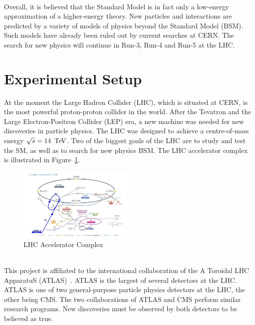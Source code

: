 \ \\Overall, it is believed that the Standard Model is in fact only a low-energy approximation of a higher-energy theory. New particles and interactions are predicted by a variety of models of physics beyond the Standard Model (BSM). Such models have already been ruled out by current searches at CERN. The search for new physics will continue in Run-3, Run-4 and Run-5 at the LHC.

\section{Experimental Setup}
\label{sec:ExperimentalSetup}

At the moment the Large Hadron Collider (LHC), which is situated at CERN, is the most powerful proton-proton collider in the world. After the Tevatron and the Large Electron-Positron Collider (LEP) era, a new machine was needed for new discoveries in particle physics. The LHC was designed to achieve a centre-of-mass energy $\sqrt{s}=14\,\TeV$. Two of the biggest goals of the LHC are to study and test the SM, as well as to search for new physics BSM. The LHC accelerator complex is illustrated in Figure~\ref{fig:LHC}.

\begin{figure}[!htb]
  \centering
  \includegraphics[width=0.5\textwidth]{plots/LHC.png} 
  \caption{LHC Accelerator Complex}
  \label{fig:LHC}
\end{figure}

\ \\This project is affiliated to the international collaboration of the A Toroidal LHC ApparatuS (ATLAS)~\cite{ATLAS}\cite{ATLASUrl}. ATLAS is the largest of several detectors at the LHC. ATLAS is one of two general-purpose particle physics detectors at the LHC, the other being CMS. The two collaborations of ATLAS and CMS perform similar research programs. New discoveries must be observed by both detectors to be believed as true. 

